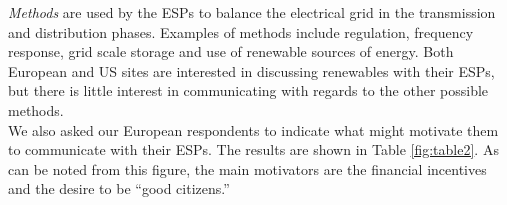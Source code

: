 

\emph{Methods} are used by the ESPs to balance the electrical grid in the transmission and distribution phases. Examples of methods include regulation, frequency response, grid scale storage and use of renewable sources of energy. Both European and US sites are interested in discussing renewables with their ESPs, but there is little interest in communicating with regards to the other possible methods. \\

We also asked our European respondents to indicate what might motivate them to communicate with their ESPs. The results are shown in Table \ref{fig:table2}. As can be noted from this figure, the main motivators are the financial incentives and the desire to be ``good citizens.''
